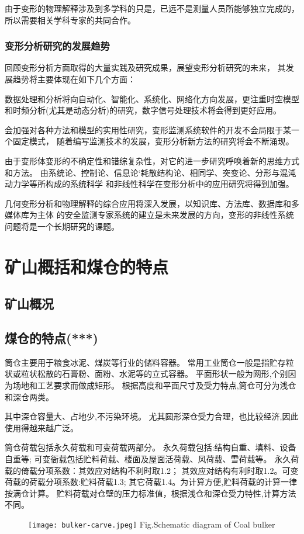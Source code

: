 由于变形的物理解释涉及到多学科的只是，已远不是测量人员所能够独立完成的，
所以需要相关学科专家的共同合作。

\subsubsection*{变形分析研究的发展趋势}
回顾变形分析方面取得的大量实践及研究成果，展望变形分析研究的未来，
其发展趋势将主要体现在如下几个方面：
\begin{asparaitem}[$\bullet$]
\item 数据处理和分析将向自动化、智能化、系统化、网络化方向发展，更注重时空模型
和时频分析(尤其是动态分析)的研究，数字信号处理技术将会得到更好应用。
\item 会加强对各种方法和模型的实用性研究，变形监测系统软件的开发不会局限于某一个固定模式，
随着编写监测技术的发展，变形分析新方法的研究将会不断涌现。
\item 由于变形体变形的不确定性和错综复杂性，对它的进一步研究呼唤着新的思维方式和方法。
由系统论、控制论、信息论‘耗散结构论、相同学、突变论、分形与混沌动力学等所构成的系统科学
和非线性科学在变形分析中的应用研究将得到加强。
\item 几何变形分析和物理解释的综合应用将深入发展，以知识库、方法库、数据库和多媒体库为主体
的安全监测专家系统的建立是未来发展的方向，变形的非线性系统问题将是一个长期研究的课题。
\end{asparaitem}


\section{矿山概括和煤仓的特点}
\subsection{矿山概况}

\subsection{煤仓的特点(***)}
筒仓主要用于粮食冰泥、煤炭等行业的储料容器。
常用工业筒仓一般是指贮存粒状或粒状松散的石膏粉、面粉、水泥等的立式容器。
平面形状一般为网形,个别因为场地和工艺要求而做成矩形。
根据高度和平面尺寸及受力特点,筒仓可分为浅仓和深仓两类。

其中深仓容量大、占地少,不污染环境。
尤其圆形深仓受力合理，也比较经济,因此使用得越来越广泛。

筒仓荷载包括永久荷载和可变荷载两部分。
永久荷载包括:结构自重、填料、设备自重等;
可变衙载包括贮料荷载、楼面及屋面活荷载、风荷载、雪荷载等。
永久荷载的倚载分项系数：其效应对结构不利时取1.2；
其效应对结构有利时取1.2。可变荷载的荷载分项系数:贮料荷载1.3;
其它荷载1.4。为计算方便,贮料荷载的计算一律按满仓计算。
贮料荷载对仓壁的压力标准值，根据浅仓和深仓受力特性,计算方法不同。
\begin{figure}[!htbp]
   \centering
   \texttt{[image: bulker-carve.jpeg]}
								{Fig.}{Schematic diagram of Coal bulker}
\end{figure}


